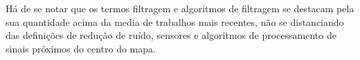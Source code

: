Há de se notar que os termos filtragem e algoritmos de filtragem se destacam pela sua quantidade acima da media de trabalhos mais recentes, não se distanciando das definições de redução de ruído, sensores e algoritmos de processamento de sinais próximos do centro do mapa.






